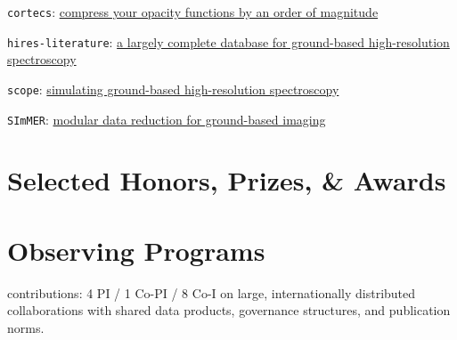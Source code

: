 \documentclass[letterpaper,11pt]{article}
\newcommand{\resumeItem}[2]{
  \item\small{
    \textbf{#1}{#2 \vspace{-2pt}}
  }
}
\newcommand{\resumeSubHeadingListStart}{\begin{itemize}[leftmargin=*]}
\newcommand{\resumeSubHeadingListEnd}{\end{itemize}}
\newcommand{\resumeItemListStart}{\begin{itemize}}
\newcommand{\resumeItemListEnd}{\end{itemize}\vspace{-5pt}}
\newcommand{\shorterSection}[1]{\vspace{-10pt}\section{#1}}
\newcommand{\shortershorterSection}[1]{\vspace{-10pt}\subsection{#1}}
\begin{document}
\begin{list}{}{\cvlist}
    \item[{\color{numcolor}\scriptsize4}] \texttt{cortecs}: \href{https://github.com/arjunsavel/cortecs}{compress your opacity functions by an order of magnitude}
    \item[{\color{numcolor}\scriptsize3}] \texttt{hires-literature}: \href{https://github.com/arjunsavel/hires-literature}{a largely complete database for ground-based high-resolution spectroscopy}
    \item[{\color{numcolor}\scriptsize2}] \texttt{scope}: \href{https://github.com/arjunsavel/scope}{simulating ground-based high-resolution spectroscopy}
    \item[{\color{numcolor}\scriptsize1}] \texttt{SImMER}: 
    \href{https://github.com/arjunsavel/SImMER}{modular data reduction for ground-based imaging}
\end{list}




%     
%     

\shorterSection{Selected Honors, Prizes, \& Awards}
\small
  \begin{list}{}{\cvlist}
    
\end{list}

\shorterSection{Observing Programs}
contributions: 4 PI / 1 Co-PI / 8 Co-I on large, internationally distributed collaborations with shared data products, governance structures, and publication norms.
\end{document}
